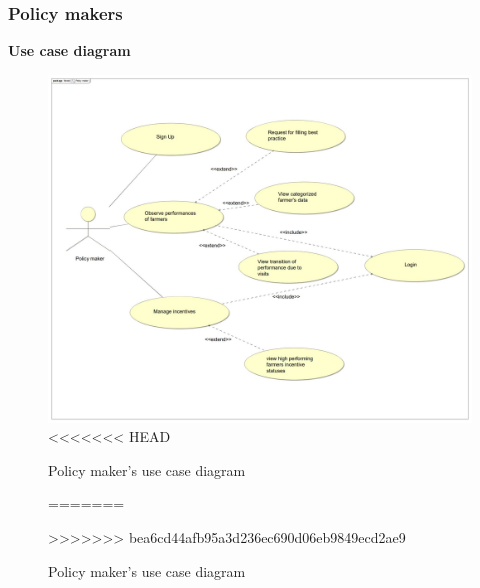 \subsubsection{Policy makers}
\textbf{\textcolor{myblue}{Use case diagram}}
\begin{figure}[H]
	\centering
    \includegraphics[page=1, width=\textwidth]{Images/ud_policy.JPG}
<<<<<<< HEAD
	\caption{\label{fig:pm_use_case_diagram}Policy maker's use case diagram}
=======
	\caption{\label{fig:use_case_diagram}Policy maker's use case diagram}
>>>>>>> bea6cd44afb95a3d236ec690d06eb9849ecd2ae9
\end{figure}
\label{sect:policy_maker_requirements}




